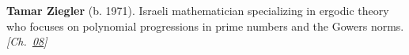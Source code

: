 \textbf{Tamar Ziegler} (b. 1971). Israeli mathematician specializing in ergodic theory who focuses on polynomial progressions in prime numbers and the Gowers norms. \emph{[Ch.~\hyperref[ch:boundedprimegaps]{08}]}

